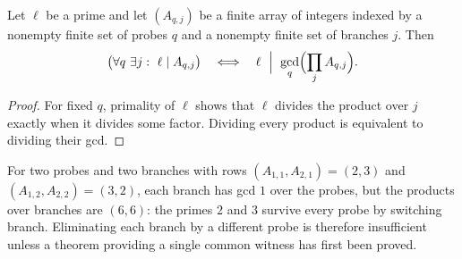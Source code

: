 \begin{lemma}\label{src:lem:gcd}
Let $\ell$ be a prime and let $(A_{q,j})$ be a finite array of integers indexed by a nonempty
finite set of probes $q$ and a nonempty finite set of branches $j$. Then
\[
\bigl(\forall q\ \exists j:\ \ell\mid A_{q,j}\bigr)
\quad\Longleftrightarrow\quad
\ell\ \Bigm|\ \gcd_q\Bigl(\prod_jA_{q,j}\Bigr) .
\]
\end{lemma}

\begin{proof}
For fixed $q$, primality of $\ell$ shows that $\ell$ divides the product over $j$ exactly when
it divides some factor. Dividing every product is equivalent to dividing their gcd.
\end{proof}

\begin{example}\label{src:ex:gcd}
For two probes and two branches with rows $(A_{1,1},A_{2,1})=(2,3)$ and
$(A_{1,2},A_{2,2})=(3,2)$, each branch has gcd $1$ over the probes, but the products over
branches are $(6,6)$: the primes $2$ and $3$ survive every probe by switching branch. Eliminating
each branch by a different probe is therefore insufficient unless a theorem providing a single
common witness has first been proved.
\end{example}

